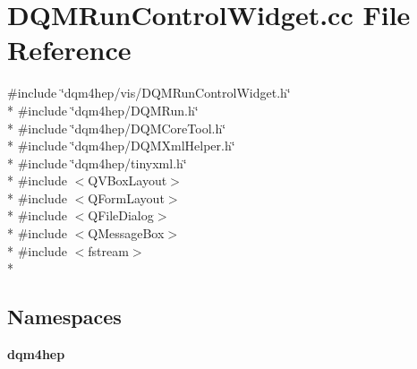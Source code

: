 \section{D\+Q\+M\+Run\+Control\+Widget.\+cc File Reference}
\label{DQMRunControlWidget_8cc}
{\ttfamily \#include \char`\"{}dqm4hep/vis/\+D\+Q\+M\+Run\+Control\+Widget.\+h\char`\"{}}\\*
{\ttfamily \#include \char`\"{}dqm4hep/\+D\+Q\+M\+Run.\+h\char`\"{}}\\*
{\ttfamily \#include \char`\"{}dqm4hep/\+D\+Q\+M\+Core\+Tool.\+h\char`\"{}}\\*
{\ttfamily \#include \char`\"{}dqm4hep/\+D\+Q\+M\+Xml\+Helper.\+h\char`\"{}}\\*
{\ttfamily \#include \char`\"{}dqm4hep/tinyxml.\+h\char`\"{}}\\*
{\ttfamily \#include $<$Q\+V\+Box\+Layout$>$}\\*
{\ttfamily \#include $<$Q\+Form\+Layout$>$}\\*
{\ttfamily \#include $<$Q\+File\+Dialog$>$}\\*
{\ttfamily \#include $<$Q\+Message\+Box$>$}\\*
{\ttfamily \#include $<$fstream$>$}\\*
\subsection*{Namespaces}
\begin{DoxyCompactItemize}
\item 
 {\bf dqm4hep}
\end{DoxyCompactItemize}
